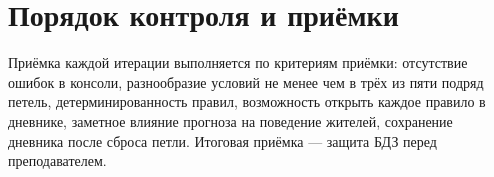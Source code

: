\documentclass[12pt]{article}
\begin{document}
\section{Порядок контроля и приёмки}
Приёмка каждой итерации выполняется по критериям приёмки: отсутствие ошибок в консоли, разнообразие условий не менее чем в трёх из пяти подряд петель, детерминированность правил, возможность открыть каждое правило в дневнике, заметное влияние прогноза на поведение жителей, сохранение дневника после сброса петли. Итоговая приёмка — защита БДЗ перед преподавателем.

\changelist
\end{document}
